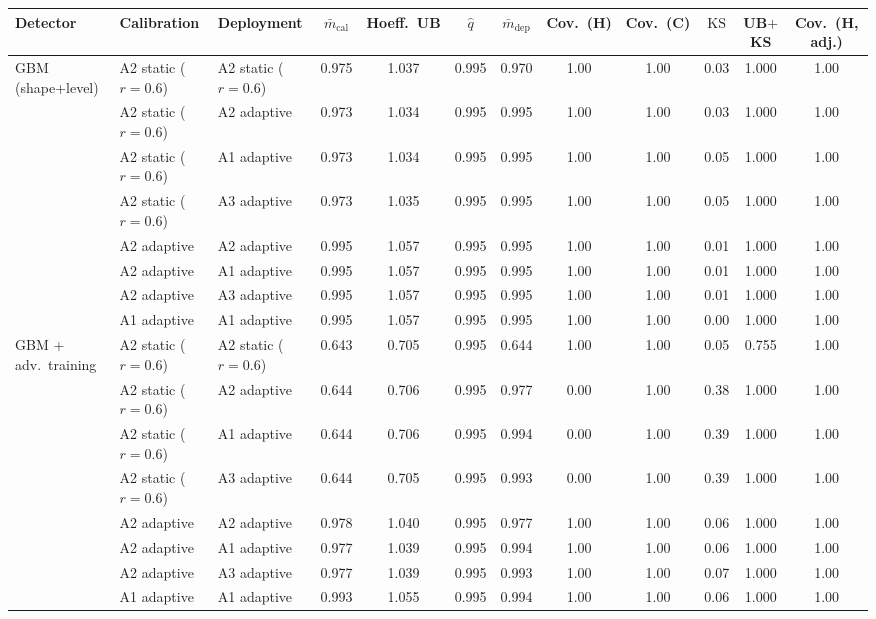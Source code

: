 \begin{tabular}{lllccccccccc}
\toprule
Detector & Calibration & Deployment & $\bar m_{\mathrm{cal}}$ & Hoeff.\ UB & $\hat q$ & $\bar m_{\mathrm{dep}}$ & Cov.\ (H) & Cov.\ (C) & $\mathrm{KS}$ & UB$+$KS & Cov.\ (H, adj.) \\
\midrule
GBM (shape+level) & A2 static ($r{=}0.6$) & A2 static ($r{=}0.6$) & 0.975 & 1.037 & 0.995 & 0.970 & 1.00 & 1.00 & 0.03 & 1.000 & 1.00 \\
 & A2 static ($r{=}0.6$) & A2 adaptive & 0.973 & 1.034 & 0.995 & 0.995 & 1.00 & 1.00 & 0.03 & 1.000 & 1.00 \\
 & A2 static ($r{=}0.6$) & A1 adaptive & 0.973 & 1.034 & 0.995 & 0.995 & 1.00 & 1.00 & 0.05 & 1.000 & 1.00 \\
 & A2 static ($r{=}0.6$) & A3 adaptive & 0.973 & 1.035 & 0.995 & 0.995 & 1.00 & 1.00 & 0.05 & 1.000 & 1.00 \\
 & A2 adaptive & A2 adaptive & 0.995 & 1.057 & 0.995 & 0.995 & 1.00 & 1.00 & 0.01 & 1.000 & 1.00 \\
 & A2 adaptive & A1 adaptive & 0.995 & 1.057 & 0.995 & 0.995 & 1.00 & 1.00 & 0.01 & 1.000 & 1.00 \\
 & A2 adaptive & A3 adaptive & 0.995 & 1.057 & 0.995 & 0.995 & 1.00 & 1.00 & 0.01 & 1.000 & 1.00 \\
 & A1 adaptive & A1 adaptive & 0.995 & 1.057 & 0.995 & 0.995 & 1.00 & 1.00 & 0.00 & 1.000 & 1.00 \\
\midrule
GBM + adv.\ training & A2 static ($r{=}0.6$) & A2 static ($r{=}0.6$) & 0.643 & 0.705 & 0.995 & 0.644 & 1.00 & 1.00 & 0.05 & 0.755 & 1.00 \\
 & A2 static ($r{=}0.6$) & A2 adaptive & 0.644 & 0.706 & 0.995 & 0.977 & 0.00 & 1.00 & 0.38 & 1.000 & 1.00 \\
 & A2 static ($r{=}0.6$) & A1 adaptive & 0.644 & 0.706 & 0.995 & 0.994 & 0.00 & 1.00 & 0.39 & 1.000 & 1.00 \\
 & A2 static ($r{=}0.6$) & A3 adaptive & 0.644 & 0.705 & 0.995 & 0.993 & 0.00 & 1.00 & 0.39 & 1.000 & 1.00 \\
 & A2 adaptive & A2 adaptive & 0.978 & 1.040 & 0.995 & 0.977 & 1.00 & 1.00 & 0.06 & 1.000 & 1.00 \\
 & A2 adaptive & A1 adaptive & 0.977 & 1.039 & 0.995 & 0.994 & 1.00 & 1.00 & 0.06 & 1.000 & 1.00 \\
 & A2 adaptive & A3 adaptive & 0.977 & 1.039 & 0.995 & 0.993 & 1.00 & 1.00 & 0.07 & 1.000 & 1.00 \\
 & A1 adaptive & A1 adaptive & 0.993 & 1.055 & 0.995 & 0.994 & 1.00 & 1.00 & 0.06 & 1.000 & 1.00 \\
\bottomrule
\end{tabular}
